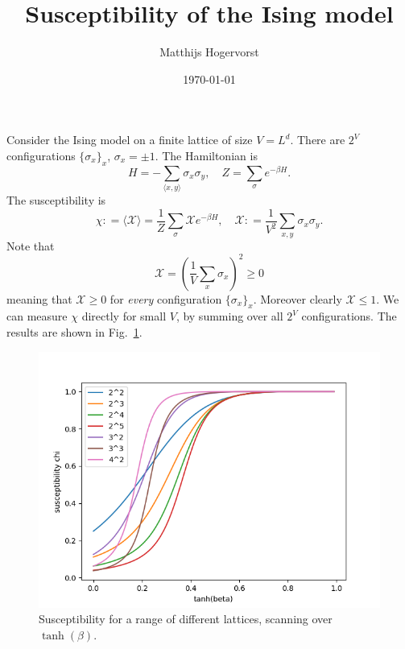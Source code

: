 \documentclass[10pt,letterpaper]{article}
\newcommand\beq{\begin{equation}}
\newcommand\eeq{\end{equation}}
\newcommand{\expec}[1]{\langle #1 \rangle}
\def\ldef{\mathrel{\mathop:}=}
\def\mca{\mathcal}
\begin{document}
\title{Susceptibility of the Ising model}
\author{Matthijs Hogervorst}
\date\today
\maketitle

Consider the Ising model on a finite lattice of size $V = L^d$. There
are $2^V$ configurations $\{\sigma_x\}_x$, $\sigma_x = \pm 1$. The
Hamiltonian is
\beq
H = - \sum_{\expec{x,y}} \sigma_x \sigma_y,
\quad
Z = \sum_{\sigma} e^{-\beta H}.
\eeq
The susceptibility is
\beq
\chi \ldef \expec{\mca{X}} = \frac{1}{Z} \sum_\sigma \mca{X} e^{-\beta H},
\quad
\mca{X} \ldef \frac{1}{V^2} \sum_{x,y} \sigma_x \sigma_y.
\eeq
Note that
\beq
\mca{X} = \left(\frac{1}{V} \sum_x \sigma_x\right)^2 \geq 0
\eeq
meaning that $\mca{X} \geq 0$ for \emph{every} configuration
$\{\sigma_x\}_x$. Moreover clearly $\mca{X} \leq 1$. We can measure
$\chi$ directly for small $V$, by summing over all $2^V$
configurations. The results are shown in Fig.~\ref{fig:susc}.
\begin{figure}[htbp]
  \begin{center}
    \includegraphics[scale=0.5]{suscepPlot.png}
    \caption{\label{fig:susc}Susceptibility for a range of different lattices,
      scanning over $\tanh(\beta)$.}
  \end{center}
\end{figure}
\end{document}
